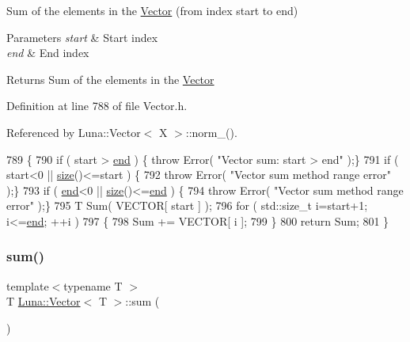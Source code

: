 Sum of the elements in the \hyperlink{classLuna_1_1Vector}{Vector} (from index start to end) 


\begin{DoxyParams}{Parameters}
{\em start} & Start index \\
\hline
{\em end} & End index \\
\hline
\end{DoxyParams}
\begin{DoxyReturn}{Returns}
Sum of the elements in the \hyperlink{classLuna_1_1Vector}{Vector} 
\end{DoxyReturn}


Definition at line 788 of file Vector.\+h.



Referenced by Luna\+::\+Vector$<$ X $>$\+::norm\+\_().


\begin{DoxyCode}
789   \{
790     \textcolor{keywordflow}{if} ( start > \hyperlink{classLuna_1_1Vector_a94f0c4fd25cb841b21d7bf7be4d6004f}{end} )   \{ \textcolor{keywordflow}{throw} Error( \textcolor{stringliteral}{"Vector sum: start > end"} );\}
791     \textcolor{keywordflow}{if} ( start<0 || \hyperlink{classLuna_1_1Vector_ac9b6ed7a0df401728f27c193fbc8f4d8}{size}()<=start ) \{
792       \textcolor{keywordflow}{throw} Error( \textcolor{stringliteral}{"Vector sum method range error"} );\}
793     \textcolor{keywordflow}{if} ( \hyperlink{classLuna_1_1Vector_a94f0c4fd25cb841b21d7bf7be4d6004f}{end}<0 || \hyperlink{classLuna_1_1Vector_ac9b6ed7a0df401728f27c193fbc8f4d8}{size}()<=\hyperlink{classLuna_1_1Vector_a94f0c4fd25cb841b21d7bf7be4d6004f}{end} )   \{
794       \textcolor{keywordflow}{throw} Error( \textcolor{stringliteral}{"Vector sum method range error"} );\}
795     T Sum( VECTOR[ start ] );
796     \textcolor{keywordflow}{for} ( std::size\_t i=start+1; i<=\hyperlink{classLuna_1_1Vector_a94f0c4fd25cb841b21d7bf7be4d6004f}{end}; ++i )
797     \{
798       Sum += VECTOR[ i ];
799     \}
800     \textcolor{keywordflow}{return} Sum;
801   \}
\end{DoxyCode}
\mbox{\label{classLuna_1_1Vector_a3f9422b246093b153a55577a6ca97e26}} 
\subsubsection{\texorpdfstring{sum()}{sum()}\hspace{0.1cm}{\footnotesize\ttfamily [2/2]}}
{\footnotesize\ttfamily template$<$typename T $>$ \\
T \hyperlink{classLuna_1_1Vector}{Luna\+::\+Vector}$<$ T $>$\+::sum (\begin{DoxyParamCaption}{ }\end{DoxyParamCaption})\hspace{0.3cm}{\ttfamily [inline]}}



